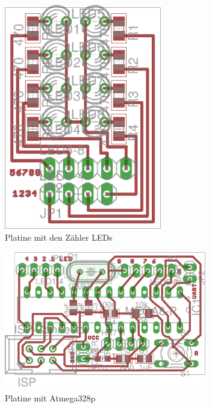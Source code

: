 \documentclass[12pt,journal]{IEEEtran}
\begin{document}
\begin{figure}[htbp]
  \centering
    \includegraphics[width=2.7in]{images/LED_Platine.png}
    \caption{Platine mit den Zähler LEDs}
  \label{fig_LED_Platine}
\end{figure}

\begin{figure}[htbp]
  \centering
    \includegraphics[width=3.5in]{images/atmega328p_platine.png}
    \caption{Platine mit Atmega328p}
  \label{fig_atmega328p_platine}
\end{figure}




\pagebreak
\end{document}

